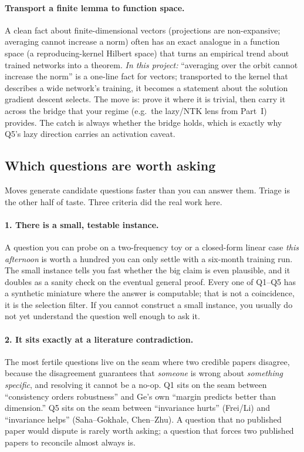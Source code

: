 \paragraph{Transport a finite lemma to function space.} A clean fact about finite-dimensional vectors
(projections are non-expansive; averaging cannot increase a norm) often has an exact analogue in a
function space (a reproducing-kernel Hilbert space) that turns an empirical trend about trained
networks into a theorem. \emph{In this project:} ``averaging over the orbit cannot increase the norm''
is a one-line fact for vectors; transported to the kernel that describes a wide network's training, it
becomes a statement about the solution gradient descent selects. The move is: prove it where it is
trivial, then carry it across the bridge that your regime (e.g.\ the lazy/NTK lens from Part~I)
provides. The catch is always whether the bridge holds, which is exactly why Q5's lazy direction
carries an activation caveat.

\subsection{Which questions are worth asking}
\label{sub:p2-worth}

Moves generate candidate questions faster than you can answer them. Triage is the other half of
taste. Three criteria did the real work here.

\paragraph{1. There is a small, testable instance.} A question you can probe on a two-frequency toy
or a closed-form linear case \emph{this afternoon} is worth a hundred you can only settle with a
six-month training run. The small instance tells you fast whether the big claim is even plausible,
and it doubles as a sanity check on the eventual general proof. Every one of Q1--Q5 has a synthetic
miniature where the answer is computable; that is not a coincidence, it is the selection filter.
If you cannot construct a small instance, you usually do not yet understand the question well enough
to ask it.

\paragraph{2. It sits exactly at a literature contradiction.} The most fertile questions live on the
seam where two credible papers disagree, because the disagreement guarantees that \emph{someone}
is wrong about \emph{something specific}, and resolving it cannot be a no-op. Q1 sits on the seam
between ``consistency orders robustness'' and Ge's own ``margin predicts better than dimension.''
Q5 sits on the seam between ``invariance hurts'' (Frei/Li) and ``invariance helps'' (Saha--Gokhale,
Chen--Zhu). A question that no published paper would dispute is rarely worth asking; a question that
forces two published papers to reconcile almost always is.

